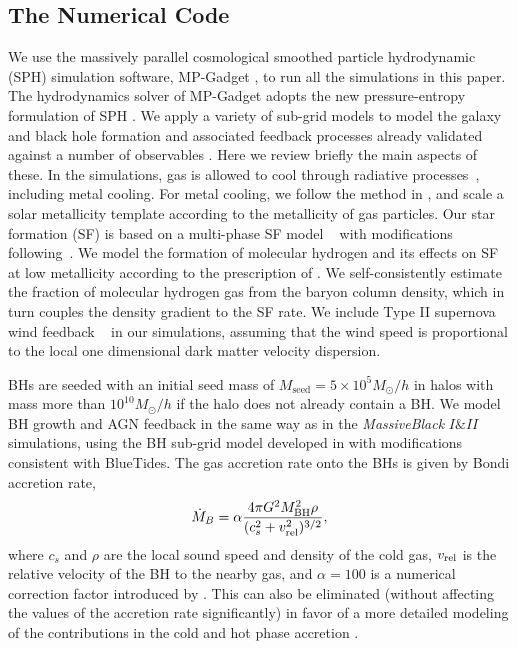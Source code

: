 \subsection{The Numerical Code}
\label{subsec:code}

We use the massively parallel cosmological smoothed particle hydrodynamic (SPH) simulation software, MP-Gadget \citep{Feng2016}, to run all the simulations in this paper. 
The hydrodynamics solver of MP-Gadget adopts the new pressure-entropy formulation of SPH \citep{Hopkins2013}.
We apply a variety of sub-grid models to model the galaxy and black hole formation and associated feedback processes already validated against a number of observables \citep[e.g.][]{Feng2016,Wilkins2017,Waters2016,DiMatteo2017,Tenneti2018,Huang2018,Ni2018,Bhowmick2018,Marshall2020,Marshall2021}. Here we review briefly the main aspects of these.
In the simulations, gas is allowed to cool through radiative processes~\citep{Katz}, including metal cooling. For metal cooling, we follow the method in \cite{Vogelsberger2014}, and scale a solar metallicity template according to the metallicity of gas particles.
Our star formation (SF) is based on a multi-phase SF model ~\citep{SH03} with modifications following~\cite{Vogelsberger2013}.
We model the formation of molecular hydrogen and its effects on SF at low metallicity according to the prescription of \cite{Krumholtz}. 
We self-consistently estimate the fraction of molecular hydrogen gas from the baryon column density, which in turn couples the density gradient to the SF rate.
We include Type II supernova wind feedback ~\citep[the model used in BlueTides][]{Feng2016,Okamoto2010} in our simulations, assuming that the wind speed is proportional to the local one dimensional dark matter velocity dispersion.

BHs are seeded with an initial seed mass of $M_{\mathrm {seed}} = 5 \times 10^5 M_{\odot}/h$ in halos with mass more than $10^{10} M_{\odot}/h$ if the halo does not already contain a BH. We model BH growth and AGN feedback in the same way as in the \textit{MassiveBlack} $I \& II$ simulations, using the BH sub-grid model developed in \cite{SDH2005,DSH2005} with modifications consistent with BlueTides. 
The gas accretion rate onto the BHs is given by Bondi accretion rate,
\begin{equation}
\label{equation:Bondi}
    \dot{M}_B = \alpha \frac{4 \pi G^2 M_{\rm BH}^2 \rho}{(c^2_s+v_{\rm rel}^2)^{3/2}},
\end{equation}
where $c_s$ and $\rho$ are the local sound speed and density of the cold gas, $v_{\rm rel}$ is the relative velocity of the BH to the nearby gas, and $\alpha=100$ is a numerical correction factor introduced by \citep{Springel2005b}. This can also be eliminated (without affecting the values of the accretion rate significantly) in favor of a more detailed modeling of the contributions in the cold and hot phase accretion \citep{Pelupessy2006}.


